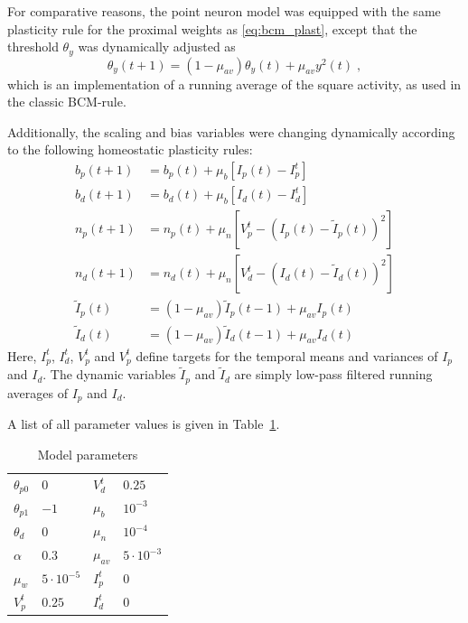\documentclass[10pt,a4paper,twocolumn]{article}
\begin{document}
		For comparative reasons, the point neuron model was equipped with the
		same plasticity rule for the proximal weights as \eqref{eq:bcm_plast}, 
		except that the threshold $\theta_y$ was dynamically adjusted as
		\begin{equation}
			\theta_y(t+1) = \left(1-\mu_{av}\right)\theta_y(t) + \mu_{av} y^2(t) \; , 
		\end{equation}
		which is an implementation of a running average of the square activity,
		as used in the classic BCM-rule.
		
		Additionally, the scaling and bias variables were changing dynamically
		according to the following homeostatic plasticity rules:
		\begin{align}
			b_p(t+1) &= b_p(t) + \mu_b \left[I_p(t) - I_p^t\right] \\
			b_d(t+1) &= b_d(t) + \mu_b \left[I_d(t) - I_d^t\right] \\
			n_p(t+1) &= n_p(t) + \mu_n \left[V_p^t - \left( I_p(t) - \tilde{I}_p(t)\right)^2\right] \\
			n_d(t+1) &= n_d(t) + \mu_n \left[V_d^t - \left( I_d(t) - \tilde{I}_d(t)\right)^2\right] \\
			\tilde{I}_p(t) &= (1-\mu_{av})\tilde{I}_p(t-1) + \mu_{av} I_p(t) \\
			\tilde{I}_d(t) &= (1-\mu_{av})\tilde{I}_d(t-1) + \mu_{av} I_d(t)
		\end{align}
		Here, $I_p^t$, $I_d^t$, $V_p^t$ and $V_p^t$ define targets for the 
		temporal means and variances of $I_p$ and $I_d$. The dynamic variables 
		$\tilde{I}_p$ and $\tilde{I}_d$ are simply low-pass filtered running 
		averages of $I_p$ and $I_d$.
		
		A list of all parameter values is given in Table~\ref{tab:parameters}.
		
		\begin{table}
			\begin{tabular}{ l | l || l | l }
				$\theta_{p0}$ & $0$ & $V_d^t$ & $0.25$ \\
				$\theta_{p1}$ & $-1$ & $\mu_b$ & $10^{-3}$ \\ 
				$\theta_{d}$ & $0$ & $\mu_n$ & $10^{-4}$ \\  
				$\alpha$ & $0.3$ & $\mu_{av}$ & $5 \cdot 10^{-3}$ \\   
				$\mu_w$ & $5 \cdot 10^{-5}$ & $I_p^t$ & $0$ \\
				$V_p^t$ & $0.25$ & $I_d^t$ & $0$  
			\end{tabular}
		\caption{Model parameters}
		\label{tab:parameters}
		\end{table}
		
\end{document}
